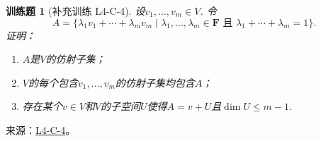 \documentclass[UTF8,12pt,a4paper,fontset=fandol]{ctexart}
\newtheorem{exercise}{训练题}[section]
\begin{document}
\begin{exercise}[补充训练 L4-C-4]\label{prob:L4-C-4}
设$v_1,\ldots,v_m\in V$. 令
        \[A=\{\lambda_1v_1+\cdots+\lambda_mv_m \mid \lambda_1,\ldots,\lambda_m\in\mathbf{F}\text{~且~}\lambda_1+\cdots+\lambda_m=1\}.\]
        证明：
        \begin{enumerate}
            \item $A$是$V$的仿射子集；

            \item $V$的每个包含$v_1,\ldots,v_m$的仿射子集均包含$A$；

            \item 存在某个$v\in V$和$V$的子空间$U$使得$A=v+U$且$\dim U\leqslant m-1$.
        \end{enumerate}
\end{exercise}
\noindent 来源：\href{https://github.com/yhwu-is/Linear-Algebra-Left-Undone/blob/new/%E8%AE%B2%E4%B9%89/%E4%B8%93%E9%A2%98/4%20%E7%BA%BF%E6%80%A7%E7%A9%BA%E9%97%B4%E7%9A%84%E8%BF%90%E7%AE%97.tex}{L4-C-4}。
\end{document}
